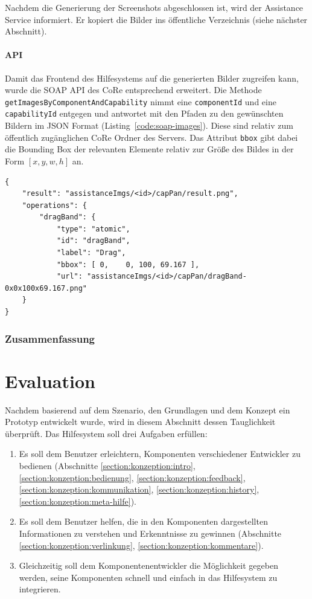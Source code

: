 \documentclass[
	headsepline,
	footsepline,
	fontsize=12pt,
	bibliography=totoc
]{scrbook}
\begin{document}
Nachdem die Generierung der Screenshots abgeschlossen ist, wird der Assistance Service informiert. Er kopiert die Bilder ins öffentliche Verzeichnis (siehe nächster Abschnitt).

\subsubsection{API}

Damit das Frontend des Hilfesystems auf die generierten Bilder zugreifen kann, wurde die SOAP API des CoRe entsprechend erweitert. Die Methode \texttt{getImagesByComponentAndCapability} nimmt eine \texttt{componentId} und eine \texttt{capabilityId} entgegen und antwortet mit den Pfaden zu den gewünschten Bildern im JSON Format (Listing~\ref{code:soap-images}). Diese sind relativ zum öffentlich zugänglichen CoRe Ordner des Servers. Das Attribut \texttt{bbox} gibt dabei die Bounding Box der relevanten Elemente relativ zur Größe des Bildes in der Form $[ x, y, w, h ]$ an.

\lstset{language=json}
\begin{lstlisting}[caption={Antwort des SOAP Interfaces}, label=code:soap-images]
{
	"result": "assistanceImgs/<id>/capPan/result.png",
	"operations": {
		"dragBand": {
			"type": "atomic",
			"id": "dragBand",
			"label": "Drag",
			"bbox": [ 0,	0, 100, 69.167 ],
			"url": "assistanceImgs/<id>/capPan/dragBand-0x0x100x69.167.png"
	}
}
\end{lstlisting}

\subsection{Zusammenfassung}
\label{section:implementierung:zusammenfassung}


\chapter{Evaluation}
\label{chapter:evaluation}

Nachdem basierend auf dem Szenario, den Grundlagen und dem Konzept ein Prototyp entwickelt wurde, wird in diesem Abschnitt dessen Tauglichkeit überprüft. Das Hilfesystem soll drei Aufgaben erfüllen:

\begin{enumerate}
	\item Es soll dem Benutzer erleichtern, Komponenten verschiedener Entwickler zu bedienen (Abschnitte \ref{section:konzeption:intro}, \ref{section:konzeption:bedienung}, \ref{section:konzeption:feedback}, \ref{section:konzeption:kommunikation}, \ref{section:konzeption:history}, \ref{section:konzeption:meta-hilfe}).
	\item Es soll dem Benutzer helfen, die in den Komponenten dargestellten Informationen zu verstehen und Erkenntnisse zu gewinnen (Abschnitte \ref{section:konzeption:verlinkung}, \ref{section:konzeption:kommentare}).
	\item Gleichzeitig soll dem Komponentenentwickler die Möglichkeit gegeben werden, seine Komponenten schnell und einfach in das Hilfesystem zu integrieren.
\end{enumerate}
\end{document}
